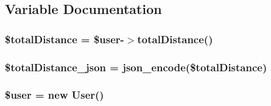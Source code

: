 \subsection{Variable Documentation}
\hypertarget{get_total_distance_8php_aecf4f5c7feb86dbfd706f9eac2f9741a}{
\subsubsection[{\$total\-Distance}]{\setlength{\rightskip}{0pt plus 5cm}\$total\-Distance = \$user-\/$>$total\-Distance()}}\label{get_total_distance_8php_aecf4f5c7feb86dbfd706f9eac2f9741a}
\hypertarget{get_total_distance_8php_a46125fa56c2833db854f0eadad2a5d2f}{
\subsubsection[{\$total\-Distance\-\_\-json}]{\setlength{\rightskip}{0pt plus 5cm}\$total\-Distance\-\_\-json = json\-\_\-encode(\$total\-Distance)}}\label{get_total_distance_8php_a46125fa56c2833db854f0eadad2a5d2f}
\hypertarget{get_total_distance_8php_a598ca4e71b15a1313ec95f0df1027ca5}{
\subsubsection[{\$user}]{\setlength{\rightskip}{0pt plus 5cm}\$user = new {\bf User}()}}\label{get_total_distance_8php_a598ca4e71b15a1313ec95f0df1027ca5}
